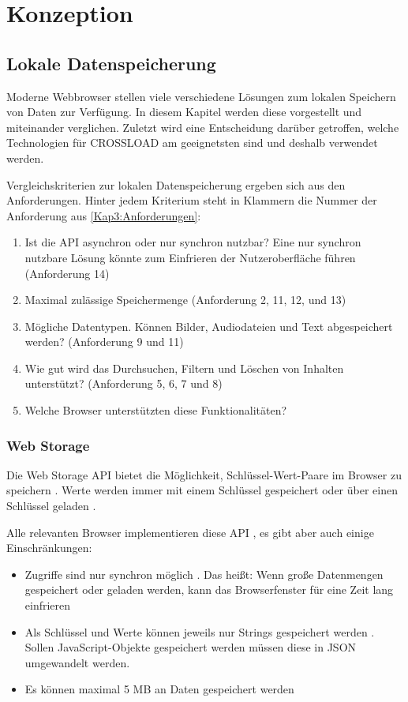 \chapter{Konzeption}
\label{Kap4}

\section{Lokale Datenspeicherung}
Moderne Webbrowser stellen viele verschiedene Lösungen zum lokalen Speichern von Daten zur Verfügung. In diesem Kapitel werden diese vorgestellt und miteinander verglichen. Zuletzt wird eine Entscheidung darüber getroffen, welche Technologien für CROSSLOAD am geeignetsten sind und deshalb verwendet werden.

Vergleichskriterien zur lokalen Datenspeicherung ergeben sich aus den Anforderungen. Hinter jedem Kriterium steht in Klammern die Nummer der Anforderung aus \autoref{Kap3:Anforderungen}:
\begin{enumerate}
	\item Ist die \ac{API} asynchron oder nur synchron nutzbar? Eine nur synchron nutzbare Lösung könnte zum Einfrieren der Nutzeroberfläche führen (Anforderung 14)
	\item Maximal zulässige Speichermenge (Anforderung 2, 11, 12, und 13)
	\item Mögliche Datentypen. Können Bilder, Audiodateien und Text abgespeichert werden? (Anforderung 9 und 11)
	\item Wie gut wird das Durchsuchen, Filtern und Löschen von Inhalten unterstützt? (Anforderung 5, 6, 7 und 8)
	\item Welche Browser unterstützten diese Funktionalitäten?
\end{enumerate}

\subsection{Web Storage}
Die Web Storage \ac{API} bietet die Möglichkeit, Schlüssel-Wert-Paare im Browser zu speichern \autocite{mdn-web-storage}. Werte werden immer mit einem Schlüssel gespeichert oder über einen Schlüssel geladen \autocite{mdn-web-storage}.

Alle relevanten Browser implementieren diese \ac{API} \autocite{mdn-web-storage}, es gibt aber auch einige Einschränkungen:
\begin{itemize}
	\item Zugriffe sind nur synchron möglich \autocite{Hajian2019}. Das heißt: Wenn große Datenmengen gespeichert oder geladen werden, kann das Browserfenster für eine Zeit lang einfrieren
	\item Als Schlüssel und Werte können jeweils nur Strings gespeichert werden \autocite{Hajian2019}. Sollen JavaScript-Objekte gespeichert werden müssen diese in JSON umgewandelt werden.
	\item Es können maximal 5 \ac{MB} an Daten gespeichert werden \autocite{mdn-web-storage}
\end{itemize}

